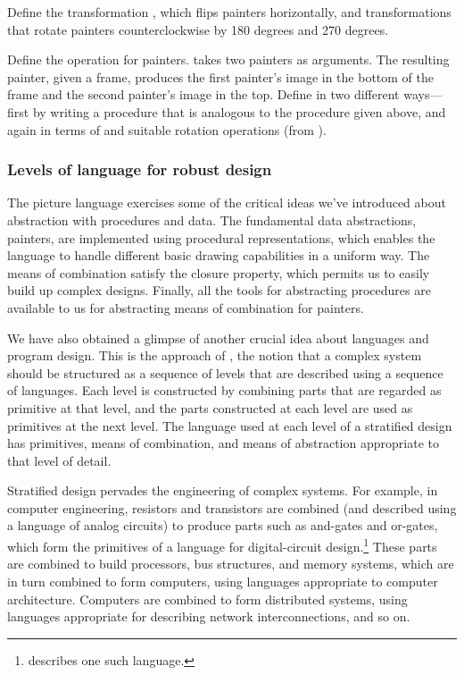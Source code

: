 \begin{exerciseGroup}
\label{Exercise 2.50}
 Define the transformation
, which flips painters horizontally, and transformations that
rotate painters counterclockwise by 180 degrees and 270 degrees.

\label{Exercise 2.51}
 Define the  operation
for painters.   takes two painters as arguments.  The resulting
painter, given a frame, produces the first painter's image in the bottom of the
frame and the second painter's image in the top.  Define  in two
different ways---first by writing a procedure that is analogous to the
 procedure given above, and again in terms of  and
suitable rotation operations (from ).
\end{exerciseGroup}

\subsubsection*{Levels of language for robust design}

The picture language exercises some of the critical ideas we've introduced
about abstraction with procedures and data.  The fundamental data abstractions,
painters, are implemented using procedural representations, which enables the
language to handle different basic drawing capabilities in a uniform way.  The
means of combination satisfy the closure property, which permits us to easily
build up complex designs.  Finally, all the tools for abstracting procedures
are available to us for abstracting means of combination for painters.

We have also obtained a glimpse of another crucial idea about languages and
program design.  This is the approach of , the
notion that a complex system should be structured as a sequence of levels that
are described using a sequence of languages.  Each level is constructed by
combining parts that are regarded as primitive at that level, and the parts
constructed at each level are used as primitives at the next level.  The
language used at each level of a stratified design has primitives, means of
combination, and means of abstraction appropriate to that level of detail.

Stratified design pervades the engineering of complex systems.  For example, in
computer engineering, resistors and transistors are combined (and described
using a language of analog circuits) to produce parts such as and-gates and
or-gates, which form the primitives of a language for digital-circuit
design.\footnote{ describes one such language.} These parts
are combined to build processors, bus structures, and memory systems, which are
in turn combined to form computers, using languages appropriate to computer
architecture.  Computers are combined to form distributed systems, using
languages appropriate for describing network interconnections, and so on.

